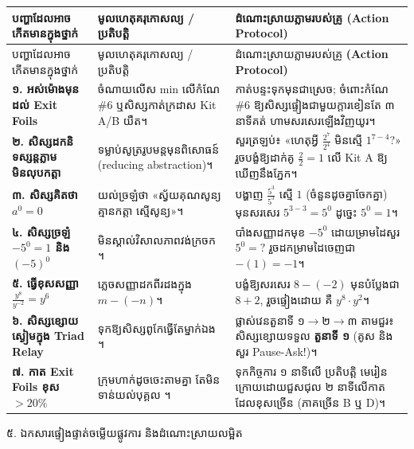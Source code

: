\documentclass[a4paper,12pt]{article}
\newcommand{\en}[1]{{\TimesEn #1}}
\newcommand{\enbf}[1]{{\TimesEn\bfseries #1}}
\newcommand{\enit}[1]{{\TimesEn\itshape #1}}
\newcommand{\cnum}[1]{{\fontsize{11pt}{13pt}\selectfont\ding{\numexpr181+#1\relax}}\hspace{0.15em}}
\newcommand{\tblhead}[1]{{\linespread{1.0}\muol\fontsize{10.2pt}{16pt}\selectfont #1\par}}
\newcommand{\secbanner}[2]{%
  \Needspace{2.2cm}%
  \begin{tcolorbox}[
    enhanced,
    colback=bannergray,
    colframe=bordergray,
    boxrule=0.9pt,
    leftrule=3.8pt,
    arc=2pt,
    top=6pt, bottom=6pt, left=9pt, right=9pt,
    before skip=10pt, after skip=6pt
  ]
    {\linespread{1.0}\muol\fontsize{12pt}{19pt}\selectfont #1}\\[-1pt]
    {\linespread{1.0}\fontsize{10pt}{14.5pt}\selectfont\enit{#2}}
  \end{tcolorbox}%
}
\begin{document}
{\linespread{1.0}\fontsize{10.2pt}{15.5pt}\selectfont
\renewcommand{\arraystretch}{1.18}
\begin{longtable}{|L{4.95cm}|L{5.35cm}|L{6.85cm}|}
\hline
{}
\tblhead{បញ្ហាដែលអាចកើតមានក្នុងថ្នាក់} & \tblhead{មូលហេតុគរុកោសល្យ / ប្រតិបត្តិ} & \tblhead{ដំណោះស្រាយភ្លាមរបស់គ្រូ \enbf{(Action Protocol)}} \\
\hline
\endfirsthead
\hline
{}
\tblhead{បញ្ហាដែលអាចកើតមានក្នុងថ្នាក់} & \tblhead{មូលហេតុគរុកោសល្យ / ប្រតិបត្តិ} & \tblhead{ដំណោះស្រាយភ្លាមរបស់គ្រូ \enbf{(Action Protocol)}} \\
\hline
\endhead
\textbf{១. អស់ម៉ោងមុនដល់ \en{Exit Foils}} & ចំណាយលើស \en{3 min} លើកំណែ \en{\#6} ឬសិស្សកាត់ក្រដាស \en{Kit A/B} យឺត។ & កាត់បន្ទះទុកមុនជាស្រេច; ចំពោះកំណែ \en{\#6} ឱ្យសិស្សផ្ទៀងជាមួយក្ដារខៀនតែ ៣ នាទីគត់ ហាមសរសេរឡើងវិញយូរ។ \\
\hline
\textbf{២. សិស្សដកនិទស្សន្តភ្លាម មិនលុបកត្តា} & ទម្លាប់សូត្ររូបមន្តមុនពិសោធន៍ (\en{reducing abstraction})។ & សួរត្រឡប់៖ «ហេតុអ្វី $\frac{2^7}{2^4}$ មិនស្មើ $1^{7-4}$?» រួចបង្ខំឱ្យដាក់គូ $\frac{2}{2}=1$ លើ \en{Kit A} ឱ្យឃើញនឹងភ្នែក។ \\
\hline
\textbf{៣. សិស្សគិតថា $a^0 = 0$} & យល់ច្រឡំថា «ស្វ័យគុណសូន្យគ្មានកត្តា ស្មើសូន្យ»។ & បង្ហាញ $\frac{5^3}{5^3}$ ស្មើ $1$ (ចំនួនដូចគ្នាចែកគ្នា) មុនសរសេរ $5^{3-3}=5^0$ ដូច្នេះ $5^0=1$។ \\
\hline
\textbf{៤. សិស្សច្រឡំ $-5^0 = 1$ និង $(-5)^0$} & មិនស្គាល់វិសាលភាពវង់ក្រចក \en{[PDF 02, 05]}។ & បាំងសញ្ញាដកមុខ $-5^0$ ដោយម្រាមដៃសួរ $5^0=?$ រួចដកម្រាមដៃចេញជា $-(1)=-1$។ \\
\hline
\textbf{៥. ធ្វើខុសសញ្ញា $\frac{y^8}{y^{-2}} = y^6$} & ភ្លេចសញ្ញាដកពីរដងក្នុង $m-(-n)$។ & បង្ខំឱ្យសរសេរ $8 - \boxed{(-2)}$ មុនបំប្លែងជា $8+2$, រួចផ្ទៀងដោយ \cnum{3} គឺ $y^8\cdot y^2$។ \\
\hline
\textbf{៦. សិស្សខ្សោយស្ងៀមក្នុង \en{Triad Relay}} & ទុកឱ្យសិស្សពូកែធ្វើតែម្នាក់ឯង \en{[PDF 15]}។ & ផ្លាស់វេនតួនាទី ១$\to$២$\to$៣ តាមជួរ៖ សិស្សខ្សោយទទួល \textbf{តួនាទី ១} (គូស \en{[tracing]} និងសួរ \en{Pause-Ask!})។ \\
\hline
\textbf{៧. កាត \en{Exit Foils} ខុស $>20\%$} & ក្រុមហាក់ដូចចេះតាមគ្នា តែមិនទាន់យល់បុគ្គល \en{[PDF 13]}។ & ទុកកិច្ចការ ១ នាទីលើ ប្រតិបត្តិ មេរៀនក្រោយដោយជួសជុល ២ នាទីលើកាតដែលខុសច្រើន (ភាគច្រើន \en{B} ឬ \en{D})។ \\
\hline
\end{longtable}}

\secbanner{៥. ឯកសារផ្ទៀងផ្ទាត់ចម្លើយផ្លូវការ និងដំណោះស្រាយលម្អិត}{Section 5: Official Answer Key, Diagnostic Rubrics \& Homework Solutions}
\end{document}
